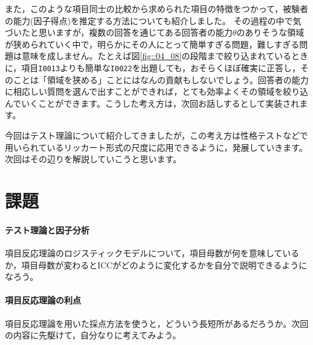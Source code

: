 \documentclass{ltjsbook}
\begin{document}
また，このような項目同士の比較から求められた項目の特徴をつかって，被験者の能力(因子得点)を推定する方法についても紹介しました。
その過程の中で気づいたと思いますが，複数の回答を通じてある回答者の能力$\theta$のありそうな領域が狭められていく中で，明らかにその人にとって簡単すぎる問題，難しすぎる問題は意味を成しません。たとえば図\ref{fig::04_08}の段階まで絞り込まれているときに，項目\texttt{I0013}よりも簡単な\texttt{I0022}を出題しても，おそらくほぼ確実に正答し，そのことは「領域を狭める」ことにはなんの貢献もしないでしょう。回答者の能力に相応しい質問を選んで出すことができれば，とても効率よくその領域を絞り込んでいくことができます。こうした考え方は，次回お話しするとして実装されます。

今回はテスト理論について紹介してきましたが，この考え方は性格テストなどで用いられているリッカート形式の尺度に応用できるように，発展していきます。次回はその辺りを解説していこうと思います。

\section{課題}
\paragraph{テスト理論と因子分析} 項目反応理論のロジスティックモデルについて，項目母数が何を意味しているか，項目母数が変わるとICCがどのように変化するかを自分で説明できるようになろう。
\paragraph{項目反応理論の利点} 項目反応理論を用いた採点方法を使うと，どういう長短所があるだろうか。次回の内容に先駆けて，自分なりに考えてみよう。
\end{document}
